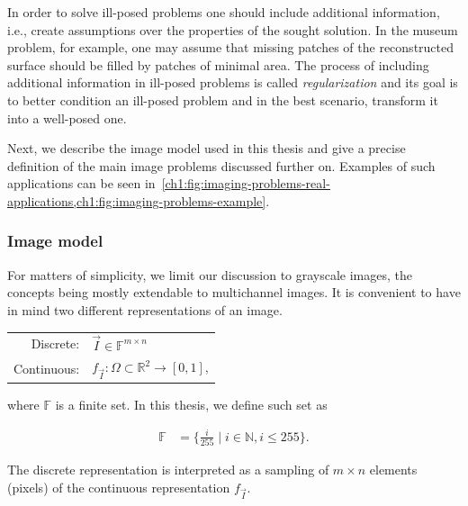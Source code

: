 In order to solve ill-posed problems one should include additional information, i.e., create assumptions over the properties of the sought solution. In the museum problem, for example, one may assume that missing patches of the reconstructed surface should be filled by patches of minimal area. The process of including additional information in ill-posed problems is called \emph{regularization} and its goal is to better condition an ill-posed problem and in the best scenario, transform it into a well-posed one. 

Next, we describe the image model used in this thesis and give a precise definition of the main image problems discussed further on. Examples of such applications can be seen in~\cref{ch1:fig:imaging-problems-real-applications,ch1:fig:imaging-problems-example}.

\subsubsection{Image model}
For matters of simplicity, we limit our discussion to grayscale images, the concepts being mostly extendable to multichannel images. It is convenient to have in mind two different representations of an image. \\

\begin{center}
\begin{tabular}{rl}
	Discrete: & $\vec{I} \in \mathbb{F}^{m \times n}$ \\
	Continuous: & $f_{\vec{I}}: \Omega \subset \mathbb{R}^2 \rightarrow [0,1]$,
\end{tabular}
\end{center}

where $\mathbb{F}$ is a finite set. In this thesis, we define such set as

\begin{align}
	\mathbb{F} &= \{ \frac{i}{255} \; | \; i \in \mathbb{N}, i \leq 255 \}.
\end{align}

The discrete representation is interpreted as a sampling of $m \times n$ elements (pixels) of the continuous representation $f_{\vec{I}}$. 

